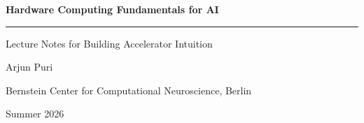 \begin{titlepage}
  \centering
  \vspace*{3cm}

  {\sffamily\Huge\bfseries Hardware Computing Fundamentals for AI}

  \vspace{0.6cm}
  {\rule{0.4\textwidth}{0.6pt}}

  \vspace{0.6cm}
  {\sffamily\Large Lecture Notes for Building Accelerator Intuition}

  \vspace{2.5cm}
  {\large Arjun Puri}

  \vspace{0.4cm}
  {\normalsize Bernstein Center for Computational Neuroscience, Berlin}

  \vfill

  {\small Summer 2026}

  \vspace{1cm}
\end{titlepage}

